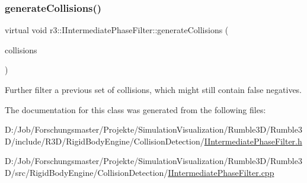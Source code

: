 \subsubsection{\texorpdfstring{generate\+Collisions()}{generateCollisions()}}
{\footnotesize\ttfamily virtual void r3\+::\+I\+Intermediate\+Phase\+Filter\+::generate\+Collisions (\begin{DoxyParamCaption}\item[{\mbox{\hyperlink{classr3_1_1_fixed_size_container}{Fixed\+Size\+Container}}$<$ \mbox{\hyperlink{classr3_1_1_collision_pair}{Collision\+Pair}} $>$ \&}]{collisions }\end{DoxyParamCaption})\hspace{0.3cm}{\ttfamily [pure virtual]}}

Further filter a previous set of collisions, which might still contain false negatives. 

The documentation for this class was generated from the following files\+:\begin{DoxyCompactItemize}
\item 
D\+:/\+Job/\+Forschungsmaster/\+Projekte/\+Simulation\+Visualization/\+Rumble3\+D/\+Rumble3\+D/include/\+R3\+D/\+Rigid\+Body\+Engine/\+Collision\+Detection/\mbox{\hyperlink{_i_intermediate_phase_filter_8h}{I\+Intermediate\+Phase\+Filter.\+h}}\item 
D\+:/\+Job/\+Forschungsmaster/\+Projekte/\+Simulation\+Visualization/\+Rumble3\+D/\+Rumble3\+D/src/\+Rigid\+Body\+Engine/\+Collision\+Detection/\mbox{\hyperlink{_i_intermediate_phase_filter_8cpp}{I\+Intermediate\+Phase\+Filter.\+cpp}}\end{DoxyCompactItemize}
